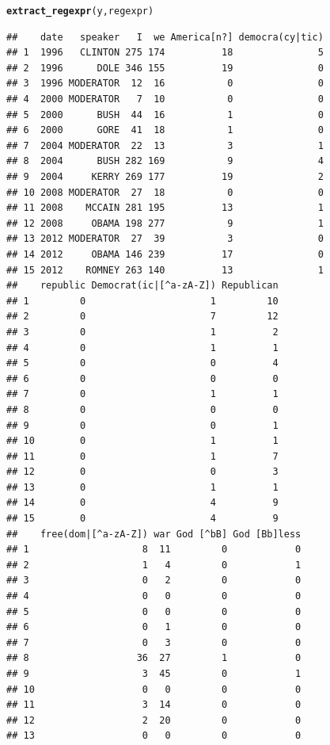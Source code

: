 \documentclass{llncs}\usepackage[]{graphicx}\usepackage[]{color}
\makeatletter
\newcommand{\hlstd}[1]{\textcolor[rgb]{0.345,0.345,0.345}{#1}}%
\newcommand{\hlkwd}[1]{\textcolor[rgb]{0.737,0.353,0.396}{\textbf{#1}}}%
\newenvironment{kframe}{%
 \def\at@end@of@kframe{}%
 \ifinner\ifhmode%
  \def\at@end@of@kframe{\end{minipage}}%
  \begin{minipage}{\columnwidth}%
 \fi\fi%
 \def\FrameCommand##1{\hskip\@totalleftmargin \hskip-\fboxsep
 \colorbox{shadecolor}{##1}\hskip-\fboxsep
     \hskip-\linewidth \hskip-\@totalleftmargin \hskip\columnwidth}%
 \MakeFramed {\advance\hsize-\width
   \@totalleftmargin\z@ \linewidth\hsize
   \@setminipage}}%
 {\par\unskip\endMakeFramed%
 \at@end@of@kframe}
\newenvironment{knitrout}{}{} %
\makeatother
\begin{document}
\begin{knitrout}
\begin{kframe}
\begin{alltt}
\hlkwd{extract_regexpr}\hlstd{(y,regexpr)}
\end{alltt}
\begin{lstlisting}[basicstyle=\ttfamily,breaklines=true]
##    date   speaker   I  we America[n?] democra(cy|tic)
## 1  1996   CLINTON 275 174          18               5
## 2  1996      DOLE 346 155          19               0
## 3  1996 MODERATOR  12  16           0               0
## 4  2000 MODERATOR   7  10           0               0
## 5  2000      BUSH  44  16           1               0
## 6  2000      GORE  41  18           1               0
## 7  2004 MODERATOR  22  13           3               1
## 8  2004      BUSH 282 169           9               4
## 9  2004     KERRY 269 177          19               2
## 10 2008 MODERATOR  27  18           0               0
## 11 2008    MCCAIN 281 195          13               1
## 12 2008     OBAMA 198 277           9               1
## 13 2012 MODERATOR  27  39           3               0
## 14 2012     OBAMA 146 239          17               0
## 15 2012    ROMNEY 263 140          13               1
##    republic Democrat(ic|[^a-zA-Z]) Republican
## 1         0                      1         10
## 2         0                      7         12
## 3         0                      1          2
## 4         0                      1          1
## 5         0                      0          4
## 6         0                      0          0
## 7         0                      1          1
## 8         0                      0          0
## 9         0                      0          1
## 10        0                      1          1
## 11        0                      1          7
## 12        0                      0          3
## 13        0                      1          1
## 14        0                      4          9
## 15        0                      4          9
##    free(dom|[^a-zA-Z]) war God [^bB] God [Bb]less
## 1                    8  11         0            0
## 2                    1   4         0            1
## 3                    0   2         0            0
## 4                    0   0         0            0
## 5                    0   0         0            0
## 6                    0   1         0            0
## 7                    0   3         0            0
## 8                   36  27         1            0
## 9                    3  45         0            1
## 10                   0   0         0            0
## 11                   3  14         0            0
## 12                   2  20         0            0
## 13                   0   0         0            0

\end{lstlisting}
\end{kframe}
\end{knitrout}
\end{document}
